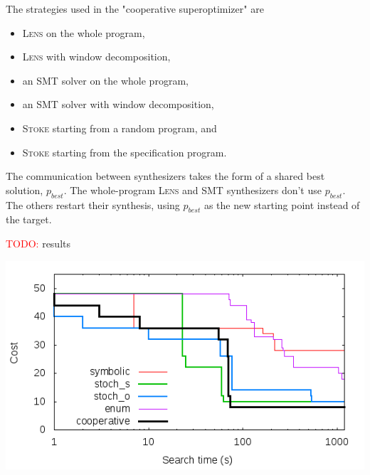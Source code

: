 \documentclass[12pt,twoside]{reedthesis}
\newcommand{\red}[1]{\textcolor{red}{#1}}
\begin{document}
The strategies used in the "cooperative superoptimizer" are
\begin{itemize}
    \item \textsc{Lens} on the whole program,
    \item \textsc{Lens} with window decomposition,
    \item an SMT solver on the whole program,
    \item an SMT solver with window decomposition,
    \item \textsc{Stoke} starting from a random program, and
    \item \textsc{Stoke} starting from the specification program.
\end{itemize}
The communication between synthesizers takes the form of a shared best solution, $p_{best}$.
The whole-program \textsc{Lens} and SMT synthesizers don't use $p_{best}$. The others restart their synthesis, using $p_{best}$ as the new starting point instead of the target.

\red{TODO:} results

\includegraphics[scale=0.5]{scaling}



\end{document}
